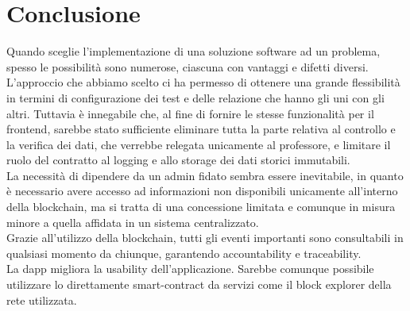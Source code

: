\section{Conclusione}

Quando sceglie l'implementazione di una soluzione software ad un problema,
spesso le possibilità sono numerose, ciascuna con vantaggi e difetti diversi. \\
L'approccio che abbiamo scelto ci ha permesso di ottenere una grande flessibilità
in termini di configurazione dei test e delle relazione che hanno gli uni con gli altri.
Tuttavia è innegabile che, al fine di fornire le stesse funzionalità per il frontend,
sarebbe stato sufficiente eliminare tutta la parte relativa al controllo e la verifica dei dati,
che verrebbe relegata unicamente al professore, e limitare il ruolo del contratto al logging e allo storage dei dati storici immutabili. \\
La necessità di dipendere da un admin fidato sembra essere inevitabile,
in quanto è necessario avere accesso ad informazioni non disponibili unicamente all'interno della blockchain,
ma si tratta di una concessione limitata e comunque in misura minore a quella affidata in un sistema centralizzato. \\
Grazie all'utilizzo della blockchain, tutti gli eventi importanti sono consultabili in qualsiasi momento da chiunque,
garantendo accountability e traceability. \\
La \gls{dapp} migliora la usability dell'applicazione.
Sarebbe comunque possibile utilizzare lo direttamente \gls{smart-contract} da servizi come il block explorer della rete utilizzata.